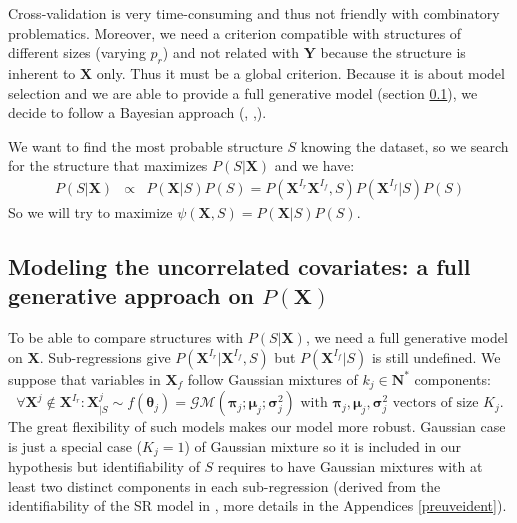 \documentclass[12pt,a4paper]{report}
\begin{document}
Cross-validation is very time-consuming and thus not friendly with combinatory problematics. Moreover, we need a criterion compatible with structures of different sizes (varying $p_r$) and not related with $\boldsymbol{Y}$ because the structure is inherent to $\boldsymbol{X}$ only. Thus it must be a global criterion. 	
Because it is about model selection and we are able to provide a full generative model (section \ref{sectionfullgen}), we decide to follow a Bayesian approach (\cite{raftery1995bayesian}, \cite{andrieu1999joint},\cite{chipman2001practical}).  
	
We want to find the most probable structure $S$ knowing the dataset, so we search for the structure that maximizes $P(S|\boldsymbol{X})$ and we have:	
	\begin{eqnarray}
	 \label{approxBIC} P(S|\boldsymbol{X})&\propto & P(\boldsymbol{X}|S)P(S)
	=P(\boldsymbol{X}^{I_r}\boldsymbol{X}^{I_f},S)P(\boldsymbol{X}^{I_f}|S)P(S)
	\end{eqnarray}
So we will try to maximize $\psi(\boldsymbol{X},S)=P(\boldsymbol{X}|S)P(S)$.
	

	\subsection{Modeling the uncorrelated covariates: a full generative approach on $P(\boldsymbol{X})$} \label{sectionfullgen}
	To be able to compare structures with $P(S|\boldsymbol{X})$, we need a full generative model on $\boldsymbol{X}$. Sub-regressions give $P(\boldsymbol{X}^{I_r}|\boldsymbol{X}^{I_f},S) $ but $P(\boldsymbol{X}^{I_f}|S)$ is still undefined. We suppose that variables in $\boldsymbol{X}_f$ follow Gaussian mixtures of $k_j \in \mathbf{N}^*$ components: 
	\begin{equation}
			\forall \boldsymbol{X}^j \notin \boldsymbol{X}^{I_r} : \boldsymbol{X}^j_{|S} \sim f(\boldsymbol{\theta}_j)=\mathcal{GM}(\boldsymbol{\pi}_j;\boldsymbol{\mu}_j;\boldsymbol{\sigma}^2_j) \textrm{ with } \boldsymbol{\pi}_j,\boldsymbol{\mu}_j,\boldsymbol{\sigma}^2_j \textrm{ vectors of size } K_j. \label{mixtureX1}
		\end{equation}
		The great flexibility \cite{mclachlan2004finite} of such models makes our model more robust. Gaussian case is just a special case ($K_j=1$) of Gaussian mixture so it is included in our hypothesis but identifiability of $S$ requires to have Gaussian mixtures with at least two distinct components in each sub-regression (derived from the identifiability of the SR model in \cite{maugis2009variable}, more details in the Appendices \ref{preuveident}).
				
\end{document}
